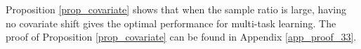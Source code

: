 Proposition \ref{prop_covariate} shows that when the sample ratio is large, having no covariate shift gives the optimal performance for multi-task learning.
The proof of Proposition \ref{prop_covariate} can be found in Appendix \ref{app_proof_33}.






